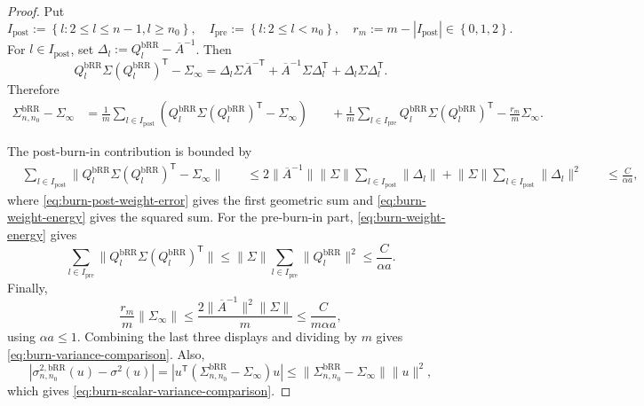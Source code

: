 \begin{proof} Put
\[
I_{\mathrm{post}} := \left\{ l: 2 \le l \le n - 1, l \ge n_{0} \right\},
\quad
I_{\mathrm{pre}} := \left\{ l: 2 \le l < n_{0} \right\},
\quad
r_{m} := m - |I_{\mathrm{post}}| \in \left\{ 0,1,2 \right\}.
\]
For $l \in I_{\mathrm{post}}$, set
$\Delta_{l} := Q_{l}^{\mathrm{bRR}} - \overline{A}^{-1}$. Then
\[
Q_{l}^{\mathrm{bRR}} \Sigma (Q_{l}^{\mathrm{bRR}})^{\mathsf{T}} - \Sigma_{\infty}
  = \Delta_{l} \Sigma \overline{A}^{-\mathsf{T}}
    + \overline{A}^{-1} \Sigma \Delta_{l}^{\mathsf{T}}
    + \Delta_{l} \Sigma \Delta_{l}^{\mathsf{T}}.
\]
Therefore
\[
\begin{aligned}
\Sigma_{n,n_{0}}^{\mathrm{bRR}} - \Sigma_{\infty}
  &= \frac{1}{m} \sum_{l \in I_{\mathrm{post}}}
      \left( Q_{l}^{\mathrm{bRR}} \Sigma (Q_{l}^{\mathrm{bRR}})^{\mathsf{T}} - \Sigma_{\infty} \right)
  &\quad + \frac{1}{m} \sum_{l \in I_{\mathrm{pre}}}
      Q_{l}^{\mathrm{bRR}} \Sigma (Q_{l}^{\mathrm{bRR}})^{\mathsf{T}}
      - \frac{r_{m}}{m} \Sigma_{\infty}.
\end{aligned}
\]

The post-burn-in contribution is bounded by
\[
\begin{aligned}
&\sum_{l \in I_{\mathrm{post}}}
  \lVert Q_{l}^{\mathrm{bRR}} \Sigma (Q_{l}^{\mathrm{bRR}})^{\mathsf{T}} - \Sigma_{\infty} \rVert
&\quad \le
  2 \lVert \overline{A}^{-1} \rVert \lVert \Sigma \rVert \sum_{l \in I_{\mathrm{post}}} \lVert \Delta_{l} \rVert
  + \lVert \Sigma \rVert \sum_{l \in I_{\mathrm{post}}} \lVert \Delta_{l} \rVert^{2}
&\quad \le \frac{C}{\alpha a},
\end{aligned}
\]
where \eqref{eq:burn-post-weight-error} gives the first geometric sum and
\eqref{eq:burn-weight-energy} gives the squared sum. For the pre-burn-in part,
\eqref{eq:burn-weight-energy} gives
\[
\sum_{l \in I_{\mathrm{pre}}}
  \lVert Q_{l}^{\mathrm{bRR}} \Sigma (Q_{l}^{\mathrm{bRR}})^{\mathsf{T}} \rVert
  \le \lVert \Sigma \rVert \sum_{l \in I_{\mathrm{pre}}} \lVert Q_{l}^{\mathrm{bRR}} \rVert^{2}
  \le \frac{C}{\alpha a}.
\]
Finally,
\[
\frac{r_{m}}{m} \lVert \Sigma_{\infty} \rVert
  \le \frac{2 \lVert \overline{A}^{-1} \rVert^{2} \lVert \Sigma \rVert}{m}
  \le \frac{C}{m \alpha a},
\]
using $\alpha a \le 1$. Combining the last three displays and dividing by $m$
gives \eqref{eq:burn-variance-comparison}. Also,
\[
|\sigma_{n,n_{0}}^{2, \mathrm{bRR}}(u) - \sigma^{2}(u)|
  = |u^{\mathsf{T}} (\Sigma_{n,n_{0}}^{\mathrm{bRR}} - \Sigma_{\infty}) u|
  \le \lVert \Sigma_{n,n_{0}}^{\mathrm{bRR}} - \Sigma_{\infty} \rVert \lVert u \rVert^{2},
\]
which gives \eqref{eq:burn-scalar-variance-comparison}. \end{proof}


